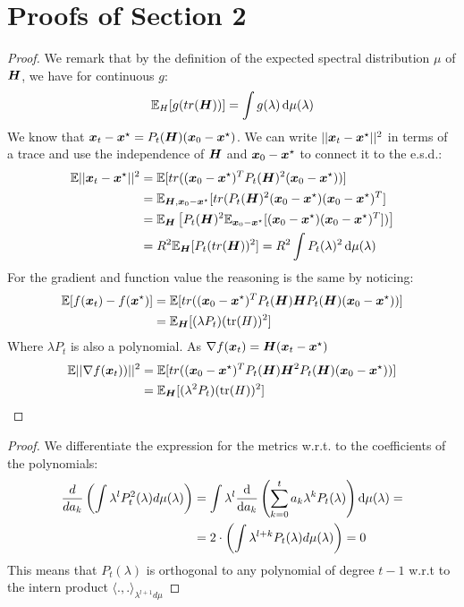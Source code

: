 \documentclass{article}
\begin{document}
\section{Proofs of Section 2}
\metrics*
\begin{proof}
\newcommand\xinit{\xx_0-\xx^\star}
We remark that by the definition of the expected spectral distribution $\mu$ of ${\boldsymbol H}$, we have for continuous $g$:
\begin{equation}
    {\mathbb{E}}_H[g(tr({\boldsymbol H}))]=\int g(\lambda)\mathop{}\!\mathrm{d} \mu(\lambda)
\end{equation}
We know that $\xx_t-\xx^\star=P_t(\HH)(\xinit)$. We can write $||{\boldsymbol x}_t-{\boldsymbol x}^\star||^2$ in terms of a trace and use the independence of ${\boldsymbol H}$ and $\xinit$ to connect it to the e.s.d.:
\begin{align}
    \mathbb{E}||\xx_t-\xx^\star||^2&=\EE[ tr((\xinit)^TP_t(\HH)^2(\xinit))] \\
    &=\EE_{\HH,\xinit} [tr(P_t(\HH)^2(\xinit)(\xinit)^T]\\
    &=\EE_\HH\left[P_t(\HH)^2\EE_{\xinit}[(\xinit)(\xinit)^T])\right]  \\
    &=R^2\EE_\HH[P_t(tr(\HH))^2]=R^2 \int P_t(\lambda)^2\dif\mu(\lambda)
\end{align}
For the gradient and function value the reasoning is the same by noticing:
\begin{align}
    \EE[f(\xx_t)-f(\xx^\star)]&=\EE[ tr((\xinit)^TP_t(\HH)\HH P_t(\HH)(\xinit))]\\
    &=\EE_\HH[(\lambda P_t)(\tr(H))^2] 
\end{align}
Where $\lambda P_t$ is also a  polynomial. As $\nabla f({\boldsymbol x}_t)={\boldsymbol H}({\boldsymbol x}_t-{\boldsymbol x}^\star)$
\begin{align}
    \EE||\nabla f(\xx_t))||^2&=\EE[ tr((\xinit)^TP_t(\HH)\HH^2 P_t(\HH)(\xinit))]\\
    &=\EE_\HH[(\lambda^2 P_t)(\tr(H))^2]
\end{align}


\end{proof}

\optimality*
\begin{proof}
We differentiate the expression for the metrics w.r.t. to the coefficients of the polynomials:
\begin{align*}
    \frac{d}{da_k}\left(\int \lambda^lP_t^2(\lambda)d\mu(\lambda)\right)&=\int\lambda^l\frac{\mathop{}\!\mathrm{d}}{\mathop{}\!\mathrm{d} a_k}\left(\sum_{k=0}^t a_k\lambda^kP_t(\lambda) \right) \mathop{}\!\mathrm{d} \mu(\lambda)=
    \\&=2\cdot\left(\int \lambda^{l+k}P_t(\lambda)d\mu(\lambda)\right)=0
\end{align*}
This means that $P_t(\lambda)$ is orthogonal to any polynomial of degree $t-1$  w.r.t to the intern product $\langle.,.\rangle_{\lambda^{l+1}d\mu}$

\end{proof}
\end{document}
